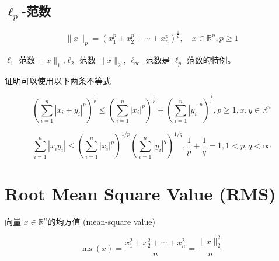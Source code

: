 \subsection{$ \ell_{p} $-范数}

\begin{definition}[$ \ell_{{p}} $-范数]
    \begin{equation} \|x\|_{p}=\left(x_{1}^{{p}}+x_{2}^{p}+\cdots+x_{n}^{p}\right)^{\frac{1}{p}}, \quad x \in \mathbb{R}^{n}, p \ge 1 \end{equation}

    $ \ell_{1} $ 范数 $ \|x\|_{1}$,$ \ell_{2} $-范数 $ \|x\|_{2} $, $ \ell_{\infty} $-范数是 $ \ell_{p} $-范数的特例。 
\end{definition}

证明可以使用以下两条不等式

\begin{theorem}
    \begin{equation} \left(\sum_{i=1}^{n}\left|x_{i}+y_{i}\right|^{p}\right)^{\frac{1}{p}} \leq\left(\sum_{i=1}^{n}\left|x_{i}\right|^{p}\right)^{\frac{1}{p}}+\left(\sum_{i=1}^{n}\left|y_{i}\right|^{p}\right)^{\frac{1}{p}}, p \geq 1, x, y \in \mathbb{R}^{n} \end{equation}
\end{theorem}

\begin{theorem}
    \begin{equation} \sum_{i=1}^{n}\left|x_{i} y_{i}\right| \leq\left(\sum_{i=1}^{n}\left|x_{i}\right|^{p}\right)^{1 / p}\left(\sum_{i=1}^{n}\left|y_{i}\right|^{q}\right)^{1 / q}, \frac{1}{p}+\frac{1}{q}=1,1<p, q<\infty \end{equation}
\end{theorem}

\section{Root Mean Square Value (RMS)}

\begin{definition}
    向量 $ x \in \mathbb{R}^n $的均方值 (mean-square value)

    \begin{equation}\operatorname{ms}(x) = \frac{x_{1}^{2}+x_{2}^{2}+\cdots+x_{n}^{2}}{n}=\frac{\|x\|_{2}^{2}}{n} \end{equation}
\end{definition}

